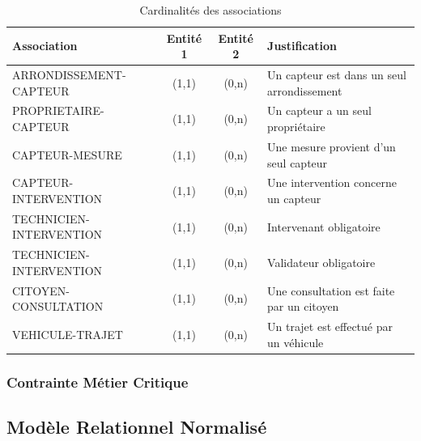 \documentclass[12pt,a4paper]{article}
\begin{document}
\begin{table}[h]
\centering
\begin{tabular}{|l|c|c|l|}
\hline
\textbf{Association} & \textbf{Entité 1} & \textbf{Entité 2} & \textbf{Justification} \\
\hline
ARRONDISSEMENT-CAPTEUR & (1,1) & (0,n) & Un capteur est dans un seul arrondissement \\
\hline
PROPRIETAIRE-CAPTEUR & (1,1) & (0,n) & Un capteur a un seul propriétaire \\
\hline
CAPTEUR-MESURE & (1,1) & (0,n) & Une mesure provient d'un seul capteur \\
\hline
CAPTEUR-INTERVENTION & (1,1) & (0,n) & Une intervention concerne un capteur \\
\hline
TECHNICIEN-INTERVENTION & (1,1) & (0,n) & Intervenant obligatoire \\
\hline
TECHNICIEN-INTERVENTION & (1,1) & (0,n) & Validateur obligatoire \\
\hline
CITOYEN-CONSULTATION & (1,1) & (0,n) & Une consultation est faite par un citoyen \\
\hline
VEHICULE-TRAJET & (1,1) & (0,n) & Un trajet est effectué par un véhicule \\
\hline
\end{tabular}
\caption{Cardinalités des associations}
\end{table}

\subsubsection{Contrainte Métier Critique}

\begin{center}
\end{center}

\subsection{Modèle Relationnel Normalisé}
\end{document}

